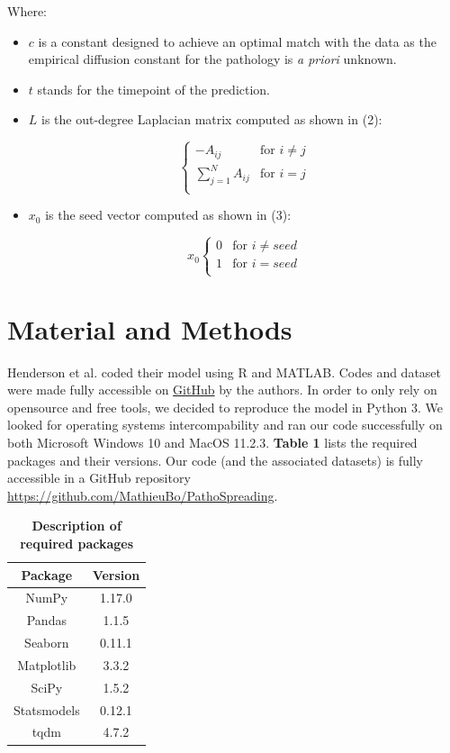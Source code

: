 Where:
\begin{itemize}
\item $c$ is a constant designed to achieve an optimal match with the data as the empirical diffusion constant for the pathology is \textit{a priori} unknown.
\item $t$ stands for the timepoint of the prediction. 
\item $L$ is the out-degree Laplacian matrix computed as shown in (2):

  \begin{equation}
    \begin{cases}
      -A_{ij} & \text{for $i \neq j$} \\
      \sum_{j=1}^N A_{ij} & \text{for $i=j$} \\
  \end{cases}
\end{equation}
\item  $x_{0}$ is the seed vector computed as shown in (3):
  
  \begin{equation}
    x_{0}
    \begin{cases}
        0 & \text{for $i \neq seed$} \\
        1 & \text{for $i = seed$} \\
    \end{cases}
  \end{equation}
\end{itemize}
   
\section{Material and Methods}
Henderson et al. coded their model using R and MATLAB. Codes and dataset were made fully accessible on \href{https://github.com/ejcorn/connectome_diffusion}{GitHub} by the authors. In order to only rely on opensource and free tools, we decided to reproduce the model in Python 3. We looked for operating systems intercompability and ran our code successfully on both Microsoft Windows 10 and MacOS 11.2.3. \textbf{Table 1} lists the required packages and their versions. Our code (and the associated datasets) is fully accessible in a GitHub repository \url{https://github.com/MathieuBo/PathoSpreading}.

\begin{table}[ht]
\begin{center}
\begin{tabular}{ |c|c| } 
 \hline
 \textbf{Package} & \textbf{Version} \\
 \hline
 NumPy & 1.17.0 \\
 Pandas & 1.1.5 \\ 
 Seaborn & 0.11.1 \\
 Matplotlib & 3.3.2 \\
 SciPy & 1.5.2 \\
 Statsmodels & 0.12.1\\
 tqdm & 4.7.2 \\
 \hline
\end{tabular}
\caption{\textbf{Description of required packages}}
\end{center}
\end{table}

